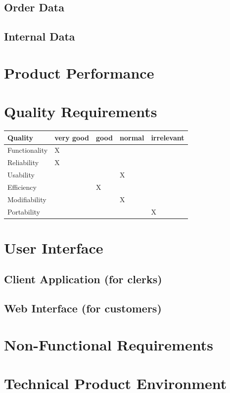 \documentclass[11pt,a4paper,oneside,svgnames,draft]{report}
\begin{document}
\section{Order Data}
\section{Internal Data}

\chapter{Product Performance}
\chapter{Quality Requirements}
\begin{table}[h!]
 \begin{tabular}{lllll}
  \hline
  Quality & very good & good & normal & irrelevant \\
  \hline
  Functionality & X & & & \\
  Reliability & X & & & \\
  Usability & & & X & \\
  Efficiency & & X & & \\
  Modifiability & & & X & \\
  Portability & & & & X \\
  \hline
 \end{tabular}
\end{table}

\chapter{User Interface}
\section{Client Application (for clerks)}
\section{Web Interface (for customers)}

\chapter{Non-Functional Requirements}
\chapter{Technical Product Environment}
\end{document}
